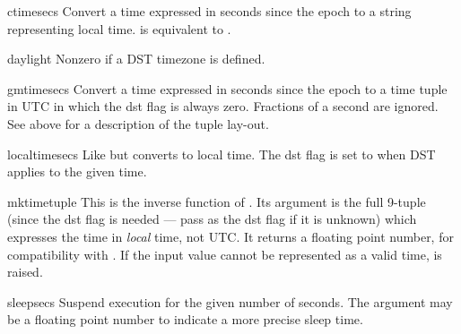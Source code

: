 \begin{funcdesc}{ctime}{secs}
Convert a time expressed in seconds since the epoch to a string
representing local time.   is equivalent to
.
\end{funcdesc}

\begin{datadesc}{daylight}
Nonzero if a DST timezone is defined.
\end{datadesc}

\begin{funcdesc}{gmtime}{secs}
Convert a time expressed in seconds since the epoch to a time tuple
in UTC in which the dst flag is always zero.  Fractions of a second are
ignored.  See above for a description of the tuple lay-out.
\end{funcdesc}

\begin{funcdesc}{localtime}{secs}
Like  but converts to local time.  The dst flag is
set to  when DST applies to the given time.
\end{funcdesc}

\begin{funcdesc}{mktime}{tuple}
This is the inverse function of .  Its argument is the
full 9-tuple (since the dst flag is needed --- pass  as the
dst flag if it is unknown) which expresses the time
in \emph{local} time, not UTC.  It returns a floating
point number, for compatibility with .  If the input
value cannot be represented as a valid time, 
is raised.
\end{funcdesc}

\begin{funcdesc}{sleep}{secs}
Suspend execution for the given number of seconds.  The argument may
be a floating point number to indicate a more precise sleep time.
\end{funcdesc}

